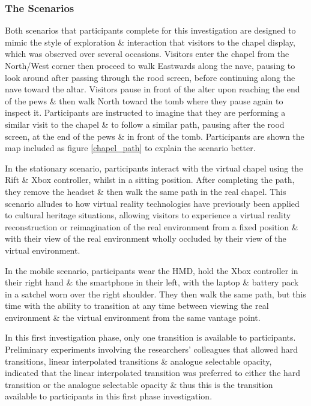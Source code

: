\subsubsection{The Scenarios}
Both scenarios that participants complete for this investigation are designed to mimic the style of exploration \& interaction that visitors to the chapel display, which was observed over several occasions. Visitors enter the chapel from the North/West corner then proceed to walk Eastwards along the nave, pausing to look around after passing through the rood screen, before continuing along the nave toward the altar. Visitors pause in front of the alter upon reaching the end of the pews \& then walk North toward the tomb where they pause again to inspect it. Participants are instructed to imagine that they are performing a similar visit to the chapel \& to follow a similar path, pausing after the rood screen, at the end of the pews \& in front of the tomb. Participants are shown the map included as figure \ref{chapel_path} to explain the scenario better.

In the stationary scenario, participants interact with the virtual chapel using the Rift \& Xbox controller, whilst in a sitting position. After completing the path, they remove the headset \& then walk the same path in the real chapel. This scenario alludes to how virtual reality technologies have previously been applied to cultural heritage situations, allowing visitors to experience a virtual reality reconstruction or reimagination of the real environment from a fixed position \& with their view of the real environment wholly occluded by their view of the virtual environment.

In the mobile scenario, participants wear the HMD, hold the Xbox controller in their right hand \& the smartphone in their left, with the laptop \& battery pack in a satchel worn over the right shoulder. They then walk the same path, but this time with the ability to transition at any time between viewing the real environment \& the virtual environment from the same vantage point.

In this first investigation phase, only one transition is available to participants. Preliminary experiments involving the researchers' colleagues that allowed hard transitions, linear interpolated transitions \& analogue selectable opacity, indicated that the linear interpolated transition was preferred to either the hard transition or the analogue selectable opacity \& thus this is the transition available to participants in this first phase investigation.

